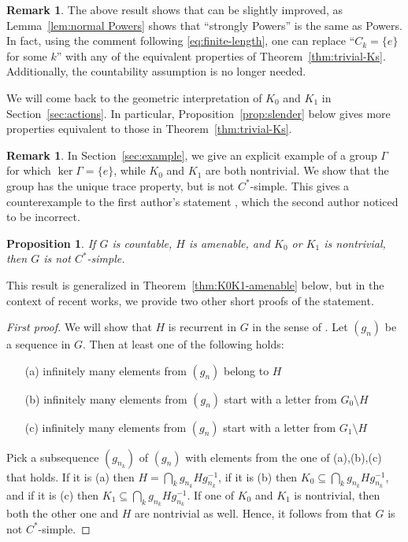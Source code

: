 \documentclass[a4paper]{amsart}
\theoremstyle{plain}
\newtheorem{proposition}[theorem]{Proposition}
\theoremstyle{definition}
\newtheorem{remark}[theorem]{Remark}
\theoremstyle{remark}
\numberwithin{theorem}{section}
\begin{document}
\begin{remark}
The above result shows that \cite[Theorem~3~(i)]{HP} can be slightly improved,
as Lemma~\ref{lem:normal Powers} shows that ``strongly Powers'' is the same as Powers.
In fact, using the comment following \eqref{eq:finite-length},
one can replace ``$C_k=\{e\}$ for some $k$'' with any of the equivalent properties of Theorem~\ref{thm:trivial-Ks}.
Additionally, the countability assumption is no longer needed.

We will come back to the geometric interpretation of $K_0$ and $K_1$ in Section~\ref{sec:actions}.
In particular, Proposition~\ref{prop:slender} below gives more properties equivalent to those in Theorem~\ref{thm:trivial-Ks}.
\end{remark}

\begin{remark}
In Section~\ref{sec:example}, we give an explicit example of a group $\Gamma$ for which $\ker\Gamma=\{e\}$,
while $K_0$ and $K_1$ are both nontrivial.
We show that the group has the unique trace property, but is not $C^*$-simple.
This gives a counterexample to the first author's statement \cite[Corollary~4.7]{Ivanov},
which the second author noticed to be incorrect.  
\end{remark}

\begin{proposition}\label{prop:cstarsimple-amalgam}
If $G$ is countable, $H$ is amenable, and $K_0$ or $K_1$ is nontrivial, then $G$ is not $C^*$-simple.
\end{proposition}

This result is generalized in Theorem~\ref{thm:K0K1-amenable} below,
but in the context of recent works, we provide two other short proofs of the statement.

\begin{proof}[First proof]
We will show that $H$ is recurrent in $G$ in the sense of \cite[Definition~5.1]{Kennedy}.
Let $(g_n)$ be a sequence in $G$.
Then at least one of the following holds:
\begin{itemize}
\item[(a)] infinitely many elements from $(g_n)$ belong to $H$
\item[(b)] infinitely many elements from $(g_n)$ start with a letter from $G_0\setminus H$
\item[(c)] infinitely many elements from $(g_n)$ start with a letter from $G_1\setminus H$
\end{itemize}
Pick a subsequence $(g_{n_k})$ of $(g_n)$ with elements from the one of (a),(b),(c) that holds.
If it is (a) then $H=\bigcap_k g_{n_k}Hg_{n_k}^{-1}$,
if it is (b) then $K_0\subseteq\bigcap_k g_{n_k}Hg_{n_k}^{-1}$,
and if it is (c) then $K_1\subseteq\bigcap_kg_{n_k}Hg_{n_k}^{-1}$.
If one of $K_0$ and $K_1$ is nontrivial, then both the other one and $H$ are nontrivial as well. 
Hence, it follows from \cite[Theorem~1.1]{Kennedy} that $G$ is not $C^*$-simple.
\end{proof}
\end{document}
